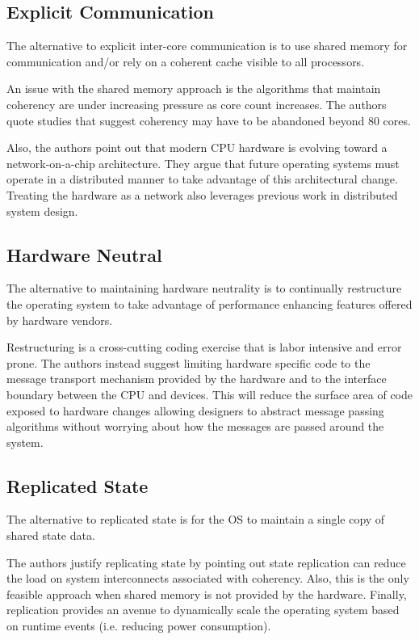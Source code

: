 \documentclass[12pt]{article}
\begin{document}
\subsection*{Explicit Communication}
The alternative to explicit inter-core communication is to use shared
memory for communication and/or rely on a coherent cache visible to
all processors.

An issue with the shared memory approach is the algorithms that
maintain coherency are under increasing pressure as core count
increases.  The authors quote studies that suggest coherency may have
to be abandoned beyond 80 cores.

Also, the authors point out that modern CPU hardware is evolving
toward a network-on-a-chip architecture.  They argue that future
operating systems must operate in a distributed manner to take
advantage of this architectural change. Treating the hardware as a
network also leverages previous work in distributed system design.


\subsection*{Hardware Neutral}
The alternative to maintaining hardware neutrality is to continually
restructure the operating system to take advantage of performance
enhancing features offered by hardware vendors.

Restructuring is a cross-cutting coding exercise that is labor
intensive and error prone.  The authors instead suggest limiting
hardware specific code to the message transport mechanism provided by
the hardware and to the interface boundary between the CPU and
devices.  This will reduce the surface area of code exposed to
hardware changes allowing designers to abstract message passing
algorithms without worrying about how the messages are passed around
the system.

\subsection*{Replicated State}
The alternative to replicated state is for the OS to maintain a single
copy of shared state data.

The authors justify replicating state by pointing out state
replication can reduce the load on system interconnects associated
with coherency.  Also, this is the only feasible approach when shared
memory is not provided by the hardware.  Finally, replication provides
an avenue to dynamically scale the operating system based on runtime
events (i.e. reducing power consumption).
\end{document}
